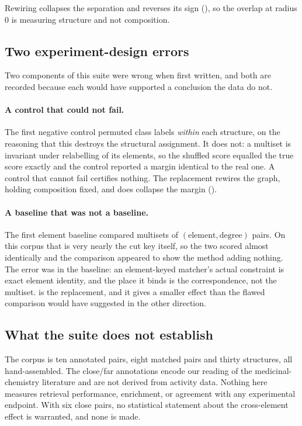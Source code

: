 \documentclass[11pt,twocolumn,a4paper]{article}
\theoremstyle{scthm}
\theoremstyle{definition}
\theoremstyle{remark}
\begin{document}
Rewiring collapses the separation and reverses its sign
(), so the overlap at radius $0$ is measuring structure
and not composition.


\subsection{Two experiment-design errors}
\label{sec:errors}

Two components of this suite were wrong when first written, and both are
recorded because each would have supported a conclusion the data do not.

\paragraph{A control that could not fail.} The first negative control
permuted class labels \emph{within} each structure, on the reasoning that
this destroys the structural assignment. It does not: a multiset is
invariant under relabelling of its elements, so the shuffled score equalled
the true score exactly and the control reported a margin identical to the
real one. A control that cannot fail certifies nothing. The replacement
rewires the graph, holding composition fixed, and does collapse the margin
().

\paragraph{A baseline that was not a baseline.} The first element baseline
compared multisets of $(\text{element},\text{degree})$ pairs. On this
corpus that is very nearly the cut key itself, so the two scored almost
identically and the comparison appeared to show the method adding nothing.
The error was in the baseline: an element-keyed matcher's actual
constraint is exact element identity, and the place it binds is the
correspondence, not the multiset.  is the replacement,
and it gives a smaller effect than the flawed comparison would have
suggested in the other direction.

\subsection{What the suite does not establish}

The corpus is ten annotated pairs, eight matched pairs and thirty
structures, all hand-assembled. The \textsf{close}/\textsf{far}
annotations encode our reading of the medicinal-chemistry literature and
are not derived from activity data. Nothing here measures retrieval
performance, enrichment, or agreement with any experimental endpoint. With
six \textsf{close} pairs, no statistical statement about the cross-element
effect is warranted, and none is made.
\end{document}
